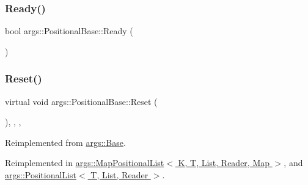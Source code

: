 \mbox{\label{classargs_1_1_positional_base_a196ab167914517cb9f97b731c3471c19}} 
\subsubsection{\texorpdfstring{Ready()}{Ready()}}
{\footnotesize\ttfamily bool args\+::\+Positional\+Base\+::\+Ready (\begin{DoxyParamCaption}{ }\end{DoxyParamCaption})\hspace{0.3cm}{\ttfamily [inline]}}

\mbox{\label{classargs_1_1_positional_base_a14edfb214858983cf5116c8d0fec72ea}} 
\subsubsection{\texorpdfstring{Reset()}{Reset()}}
{\footnotesize\ttfamily virtual void args\+::\+Positional\+Base\+::\+Reset (\begin{DoxyParamCaption}{ }\end{DoxyParamCaption})\hspace{0.3cm}{\ttfamily [inline]}, {\ttfamily [override]}, {\ttfamily [virtual]}, {\ttfamily [noexcept]}}



Reimplemented from \hyperlink{classargs_1_1_base_ac7cfc851174f71e00173121d3013dab1}{args\+::\+Base}.



Reimplemented in \hyperlink{classargs_1_1_map_positional_list_a69eefecdabf07a4fac7006acb2b144d3}{args\+::\+Map\+Positional\+List$<$ K, T, List, Reader, Map $>$}, and \hyperlink{classargs_1_1_positional_list_ab322681ccb2b97aa10461aba04bd8aba}{args\+::\+Positional\+List$<$ T, List, Reader $>$}.

\mbox{\label{classargs_1_1_positional_base_ae328a7b091e6a409df34309a2fb44a71}} 
